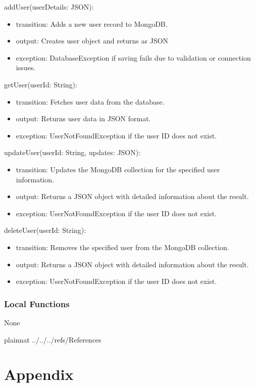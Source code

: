 \documentclass[12pt, titlepage]{article}
\begin{document}
\noindent addUser(userDetails: JSON):
\begin{itemize}
  \item transition: Adds a new user record to MongoDB.
  \item output: Creates user object and returns as JSON
  \item exception: DatabaseException if saving fails due to validation or connection issues.
\end{itemize}

\noindent getUser(userId: String):
\begin{itemize}
  \item transition: Fetches user data from the database.
  \item output: Returns user data in JSON format.
  \item exception: UserNotFoundException if the user ID does not exist.
\end{itemize}

\noindent updateUser(userId: String, updates: JSON):
\begin{itemize}
  \item transition: Updates the MongoDB collection for the specified user information.
  \item output: Returns a JSON object with detailed information about the result.
  \item exception: UserNotFoundException if the user ID does not exist.
\end{itemize}

\noindent deleteUser(userId: String):
\begin{itemize}
  \item transition: Removes the specified user from the MongoDB collection.
  \item output: Returns a JSON object with detailed information about the result.
  \item exception: UserNotFoundException if the user ID does not exist.
\end{itemize}

\subsubsection{Local Functions}
None

\newpage

 {plainnat}
 {../../../refs/References}

\newpage

\section{Appendix} \label{Appendix}
\end{document}
